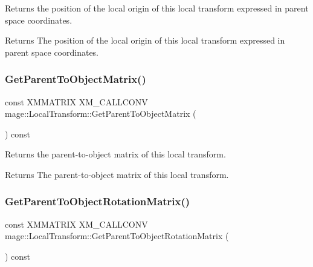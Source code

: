 Returns the position of the local origin of this local transform expressed in parent space coordinates.

\begin{DoxyReturn}{Returns}
The position of the local origin of this local transform expressed in parent space coordinates. 
\end{DoxyReturn}
\mbox{\label{classmage_1_1_local_transform_a3cc177e24cac45b28231943f7e7d7b03}} 
\subsubsection{\texorpdfstring{Get\+Parent\+To\+Object\+Matrix()}{GetParentToObjectMatrix()}}
{\footnotesize\ttfamily const X\+M\+M\+A\+T\+R\+IX X\+M\+\_\+\+C\+A\+L\+L\+C\+O\+NV mage\+::\+Local\+Transform\+::\+Get\+Parent\+To\+Object\+Matrix (\begin{DoxyParamCaption}{ }\end{DoxyParamCaption}) const\hspace{0.3cm}{\ttfamily [noexcept]}}

Returns the parent-\/to-\/object matrix of this local transform.

\begin{DoxyReturn}{Returns}
The parent-\/to-\/object matrix of this local transform. 
\end{DoxyReturn}
\mbox{\label{classmage_1_1_local_transform_a5054e57409d6852adcde6283ca8a5c49}} 
\subsubsection{\texorpdfstring{Get\+Parent\+To\+Object\+Rotation\+Matrix()}{GetParentToObjectRotationMatrix()}}
{\footnotesize\ttfamily const X\+M\+M\+A\+T\+R\+IX X\+M\+\_\+\+C\+A\+L\+L\+C\+O\+NV mage\+::\+Local\+Transform\+::\+Get\+Parent\+To\+Object\+Rotation\+Matrix (\begin{DoxyParamCaption}{ }\end{DoxyParamCaption}) const\hspace{0.3cm}{\ttfamily [noexcept]}}


